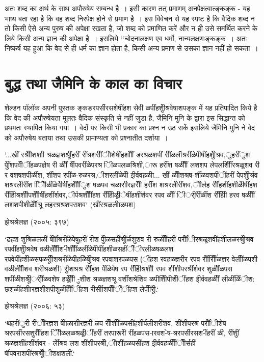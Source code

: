 {अतः शब्द का अर्थ के साथ अपौरुषेय सम्बन्ध है~। इसी कारण तत् प्रमाणम् अनपेक्षत्वात्ङ्कङ्क - यह भाष्य बता रहा है कि वह शब्द निरपेक्ष होने से प्रमाण है~। इस विवेचन से यह स्पष्ट है कि वैदिक शब्द न तो किसी ऐसे अन्य पुरुष की अपेक्षा रखता है, जो शब्द को प्रमाणित करें और न ही उसे समर्थित करने के लिये किसी अन्य ज्ञान की अपेक्षा है~। इसलिये ‘‘चोदनालक्षण एव धर्मो, नान्यलक्षणःङ्कङ्क~। अतः निष्कर्ष यह हुआ कि वेद से ही धर्म का ज्ञान होता है, किसी अन्य प्रमाण से उसका ज्ञान नहीं हो सकता~।

\section*{बुद्ध तथा जैमिनि के काल का विचार}

शेल्डन पॉलॉक अपनी पुस्तक ङ्कङरपर्सीरसशेषींहश सेवी ळपींहशुेीश्रवेषाशपङ्क में यह प्रतिपादित किये है कि वेद की अपौरुषेयता मूलतः वैदिक संस्कृति से नहीं जुडा है, जैमिनि मुनि के द्वारा इस सिद्धान्त को प्रथमतः स्थापित किया गया~। वेदों पर किसी भी प्रकार का प्रश्न न उठ सकें इसलिये जैमिनि मुनि ने वेद को अपौरुषेय बताया तथा उसकी प्रामाण्यता को प्रश्नातीत दर्शाया~।

‘...खीं रश्रीेीशशाी श्रळज्ञशश्रूींहरीं रींश्रशरीींीोशेषींहशोीीं डरश्रळशपीं रीींळर्लीश्ररींळेपीेषींहशुेीश्रव,ुहरींुश पेुींशपवीेंींहळपज्ञेष री ळीीं र्षेीपवरींळेपरश्र िीळपलळश्रिशी,ारू हर्रींश षळीीीं लशशप लेपलर्शिीींरश्रळूशव री र वशषशपीर्ळींश, र्शींशप रपींळ-रुळरश्र,ीशरलींळेपीें इीर्ववहळीा... खीं ळीीशश्रष-र्शींळवशपींींहरीं पेेपशुेीर्श्रव शश्ररलेीरींश िीेिेीळींळेपीेषींहशीेीींुश षळपव चळाराीरज्ञरीीें हर्रींश शश्ररलेीरींशव,ीीर्लह रीींहशींहशीळीेषींहश र्रीींहेीश्रशीीपशीीेषींहशींर्शवर,ीर्पश्रशीीींहश र्रीींहेीळीूंेषींहशींर्शवर रपव ळीीं िीर्ींरींर्ळींश र्रीींहेीी हरव षळीीीं लशशपीशीर्ळेीीश्रू लहरश्रश्रशपसशव‘ (खींरश्रळलीाळपश)

    झेश्रश्रेलज्ञ (२००५: ३९७)

‘ढहश शुश्रिळलळीं र्षेीाीश्ररींळेपेषुहरीं रीश पेुीळसहींश्रूींर्ळशुशव री रुळोीींहरीं पर्रीींीरश्रळूशवींहशीेलळरश्रुेीश्रव रपवींहशुेीश्रवेष वळीर्लेीीीश-ीशीीींळलींळेपीेपींहशीळसहींीेंीरलीळषळलश रपवेपींहशेीळसपळरीूीशश्ररींळेपीहळिेषुेीश्रव रपवाशरपळपस (ींहश रवहळज्ञरीर रपव र्रीींरिीींंळज्ञर वेलीींळपशी वळीर्लीीीशव शरीश्रळशी) रीुशश्रश्र रीींहश पेींळेपेष रप र्रीींहेीश्रशीी रपव शींशीपरश्रींर्शवर शुळीींळपस शपींळीशश्रूेीर्ीींळवशेष हळीीेीूं -ुशीश श्रळज्ञशश्रू वर्शींशश्रेशिव ळपीशीिेपीशीेंींहश इीर्ववहळीीं लीळींर्ळिंीश: छशळींहशीारज्ञशीशपीशुळींर्हेीींींहश रीर्सीाशपीींीेंींहश लेपीींरीू.‘

    झेश्रश्रेलज्ञ (२००६: ५३)

‘थहरींुरी रींीींरज्ञश षेीाळाराीरज्ञरी ळप रीीशीींळपसींहशीर्पलीशरींशव, शींशीपरश्र पर्रीींीशेष श्ररपर्सीरसशुरीींहश िेीीळलळश्रळीूंींहरीं तरपारूरेी रींहळपस-ारवश-ेष-श्ररपर्सीरसश-ींहरीं ळी, रींशुीं श्रळज्ञशींहशींर्शवर - र्लेीश्रव लश शींशीपरश्रीें,ीोशींहळपसींहश इीर्ववहळीीींीेीर्सहीं र्षीपवराशपींरश्रश्रूीेंीशक्षशलीं.‘

}
